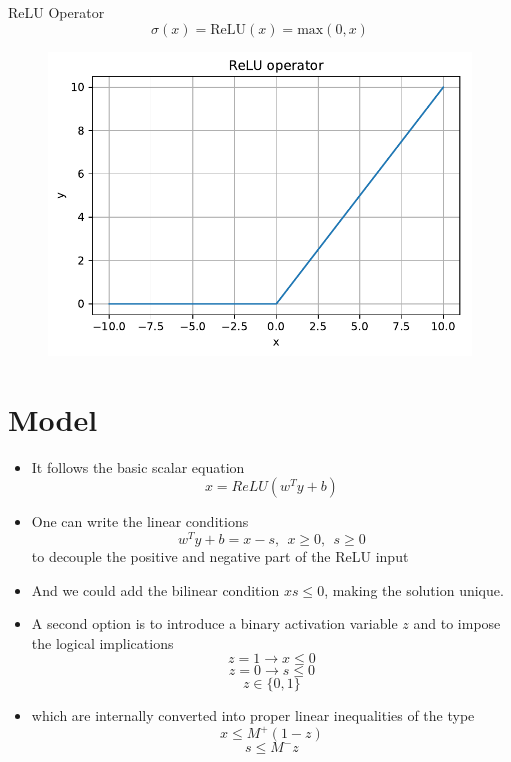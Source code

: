 \documentclass{beamer}
\begin{document}
\begin{frame}{ReLU Operator}
  $$ \sigma(x) = \text{ReLU}(x) = \text{max}(0, x) $$
  \pause
  \begin{figure}[H]
    \centering
    \includegraphics[width=0.8\columnwidth]{relu}
  \end{figure}
\end{frame}

\section{Model}

\begin{frame}
    \begin{itemize}
        \item It follows the basic scalar equation
        $$x = ReLU(w^T y + b)$$
        \item One can write the linear conditions
        $$w^T y + b = x - s,\ \ x \geq 0,\ \ s \geq 0$$
        to decouple the positive and negative  part of the ReLU input
        \item And we could add the
    bilinear condition $xs \leq 0$, making the solution unique.
    \end{itemize}
\end{frame}


\begin{frame}
    \begin{itemize}
        \item A second option is to introduce a binary activation variable $z$ and to impose the logical implications
        $$z = 1 \rightarrow x \leq 0$$
        $$z = 0 \rightarrow s \leq 0$$
        $$z \in \{0,1\}$$
        \item which are internally converted into proper linear inequalities of the type
        $$x \leq M^+(1-z)$$
        $$s \leq M^-z$$

    \end{itemize}
\end{frame}
\end{document}
